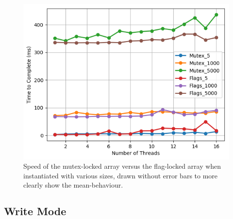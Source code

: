 \documentclass[11pt]{article}
\begin{document}
\begin{figure}
\centering
\includegraphics[scale=0.65]{step6_2.png}
\caption{Speed of the mutex-locked array versus the flag-locked array when instantiated with various sizes, drawn without error bars to more clearly show the mean-behaviour.}
\label{fig:step6_2}
\end{figure}

\subsection{Write Mode}
\end{document}
